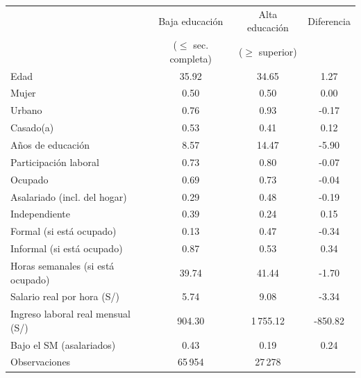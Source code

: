\begin{tabular}{lccc}
\toprule
 & Baja educación & Alta educación & Diferencia \\
 & ($\le$ sec. completa) & ($\ge$ superior) & \\
\midrule
Edad & 35.92 & 34.65 & 1.27 \\
Mujer & 0.50 & 0.50 & 0.00 \\
Urbano & 0.76 & 0.93 & -0.17 \\
Casado(a) & 0.53 & 0.41 & 0.12 \\
Años de educación & 8.57 & 14.47 & -5.90 \\
Participación laboral & 0.73 & 0.80 & -0.07 \\
Ocupado & 0.69 & 0.73 & -0.04 \\
Asalariado (incl. del hogar) & 0.29 & 0.48 & -0.19 \\
Independiente & 0.39 & 0.24 & 0.15 \\
Formal (si está ocupado) & 0.13 & 0.47 & -0.34 \\
Informal (si está ocupado) & 0.87 & 0.53 & 0.34 \\
Horas semanales (si está ocupado) & 39.74 & 41.44 & -1.70 \\
Salario real por hora (S/) & 5.74 & 9.08 & -3.34 \\
Ingreso laboral real mensual (S/) & 904.30 & 1\,755.12 & -850.82 \\
Bajo el SM (asalariados) & 0.43 & 0.19 & 0.24 \\
\midrule
Observaciones & 65\,954 & 27\,278 & \\
\bottomrule
\end{tabular}
